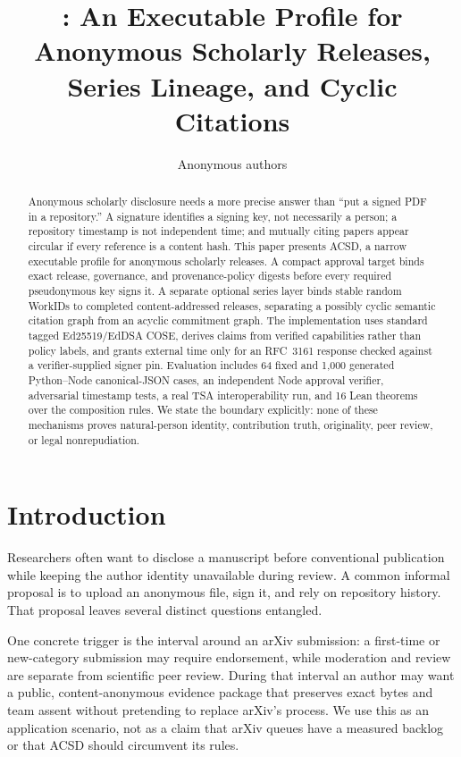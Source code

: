 \documentclass[11pt]{article}
\title{\acsd: An Executable Profile for Anonymous Scholarly Releases,\\ Series Lineage, and Cyclic Citations}
\author{Anonymous authors}
\date{}
\newcommand{\workid}{\textsf{WorkID}}
\newcommand{\acsd}{\textsc{ACSD}}
\begin{document}
\maketitle

\begin{abstract}
Anonymous scholarly disclosure needs a more precise answer than ``put a signed PDF in a repository.'' A signature identifies a signing key, not necessarily a person; a repository timestamp is not independent time; and mutually citing papers appear circular if every reference is a content hash. This paper presents \acsd, a narrow executable profile for anonymous scholarly releases. A compact approval target binds exact release, governance, and provenance-policy digests before every required pseudonymous key signs it. A separate optional series layer binds stable random \workid s to completed content-addressed releases, separating a possibly cyclic semantic citation graph from an acyclic commitment graph. The implementation uses standard tagged Ed25519/EdDSA COSE, derives claims from verified capabilities rather than policy labels, and grants external time only for an RFC~3161 response checked against a verifier-supplied signer pin. Evaluation includes 64 fixed and 1,000 generated Python--Node canonical-JSON cases, an independent Node approval verifier, adversarial timestamp tests, a real TSA interoperability run, and 16 Lean theorems over the composition rules. We state the boundary explicitly: none of these mechanisms proves natural-person identity, contribution truth, originality, peer review, or legal nonrepudiation.
\end{abstract}

\section{Introduction}

Researchers often want to disclose a manuscript before conventional publication while keeping the author identity unavailable during review. A common informal proposal is to upload an anonymous file, sign it, and rely on repository history. That proposal leaves several distinct questions entangled.

One concrete trigger is the interval around an arXiv submission: a first-time or
new-category submission may require endorsement, while moderation and review
are separate from scientific peer review. During that interval an author may
want a public, content-anonymous evidence package that preserves exact bytes
and team assent without pretending to replace arXiv's process. We use this as
an application scenario, not as a claim that arXiv queues have a measured
backlog or that ACSD should circumvent its rules.
\end{document}
